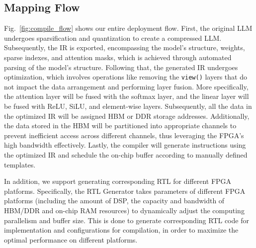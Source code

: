 \vspace{-5pt}
\subsection{Mapping Flow}

Fig.~\ref{fig:compile_flow} shows our entire deployment flow. 
First, the original LLM undergoes sparsification and quantization to create a compressed LLM. Subsequently, the IR is exported, encompassing the model's structure, weights, sparse indexes, and attention masks, which is achieved through automated parsing of the model's structure. Following that, the generated IR undergoes optimization, which involves operations like removing the \texttt{view()} layers that do not impact the data arrangement and performing layer fusion. More specifically, the attention layer will be fused with the softmax layer, and the linear layer will be fused with ReLU, SiLU, and element-wise layers. Subsequently, all the data in the optimized IR will be assigned HBM or DDR storage addresses. Additionally, the data stored in the HBM will be partitioned into appropriate channels to prevent inefficient access across different channels, thus leveraging the FPGA's high bandwidth effectively. Lastly, the compiler will generate instructions using the optimized IR and schedule the on-chip buffer according to manually defined templates.

In addition, we support generating corresponding RTL for different FPGA platforms. Specifically, the RTL Generator takes parameters of different FPGA platforms (including the amount of DSP, the capacity and bandwidth of HBM/DDR and on-chip RAM resources) to dynamically adjust the computing parallelism and buffer size. This is done to generate corresponding RTL code for implementation and configurations for compilation, in order to maximize the optimal performance on different platforms.